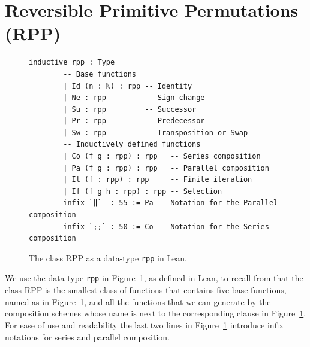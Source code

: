 \documentclass[preprint]{elsarticle}
\theoremstyle{remark}
\newcommand{\RPP}{\textsf{RPP}\xspace}
\newcommand{\LEAN}{\textsf{Lean}\xspace}
\begin{document}
\section{Reversible Primitive Permutations (\RPP) }
\label{section:Reversible Primitive Permutations}

\begin{figure}
    \centering
        \begin{lstlisting}[basicstyle=\small]
        inductive rpp : Type
        -- Base functions
        | Id (n : ℕ) : rpp -- Identity
        | Ne : rpp         -- Sign-change
        | Su : rpp         -- Successor
        | Pr : rpp         -- Predecessor
        | Sw : rpp         -- Transposition or Swap
        -- Inductively defined functions
        | Co (f g : rpp) : rpp   -- Series composition
        | Pa (f g : rpp) : rpp   -- Parallel composition
        | It (f : rpp) : rpp     -- Finite iteration
        | If (f g h : rpp) : rpp -- Selection
        infix `‖`  : 55 := Pa -- Notation for the Parallel composition
        infix `;;` : 50 := Co -- Notation for the Series composition
        \end{lstlisting}
    \caption{The class \RPP as a data-type \lstinline|rpp| in \LEAN.}
    \label{fig:RPP-LEAN}
\end{figure}

We use the data-type \lstinline|rpp| in Figure~\ref{fig:RPP-LEAN}, as defined in \LEAN, to recall from \cite{DBLP:journals/tcs/PaoliniPR20} that the class \RPP is the smallest class of functions
that contains five base functions, named as in Figure~\ref{fig:RPP-LEAN}, and all the functions that we can generate by the composition schemes whose name is next to the corresponding clause in Figure~\ref{fig:RPP-LEAN}. For ease of use and readability the last two lines in Figure~\ref{fig:RPP-LEAN} introduce infix notations for series and parallel composition.
\end{document}
